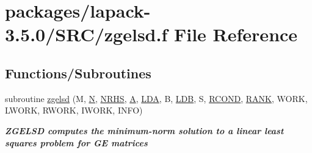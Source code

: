 \hypertarget{zgelsd_8f}{}\section{packages/lapack-\/3.5.0/\+S\+R\+C/zgelsd.f File Reference}
\label{zgelsd_8f}
\subsection*{Functions/\+Subroutines}
\begin{DoxyCompactItemize}
\item 
subroutine \hyperlink{group__complex16GEsolve_gae06e94cada1d406119efa6251a4eb308}{zgelsd} (M, \hyperlink{polmisc_8c_a0240ac851181b84ac374872dc5434ee4}{N}, \hyperlink{example__user_8c_aa0138da002ce2a90360df2f521eb3198}{N\+R\+H\+S}, \hyperlink{classA}{A}, \hyperlink{example__user_8c_ae946da542ce0db94dced19b2ecefd1aa}{L\+D\+A}, B, \hyperlink{example__user_8c_a50e90a7104df172b5a89a06c47fcca04}{L\+D\+B}, S, \hyperlink{superlu__enum__consts_8h_af00a42ecad444bbda75cde1b64bd7e72a9b5c151728d8512307565994c89919d5}{R\+C\+O\+N\+D}, \hyperlink{splinemodule_8c_a3a88bcc63386de30443dacede2e01847}{R\+A\+N\+K}, W\+O\+R\+K, L\+W\+O\+R\+K, R\+W\+O\+R\+K, I\+W\+O\+R\+K, I\+N\+F\+O)
\begin{DoxyCompactList}\small\item\em {\bfseries  Z\+G\+E\+L\+S\+D computes the minimum-\/norm solution to a linear least squares problem for G\+E matrices} \end{DoxyCompactList}\end{DoxyCompactItemize}
